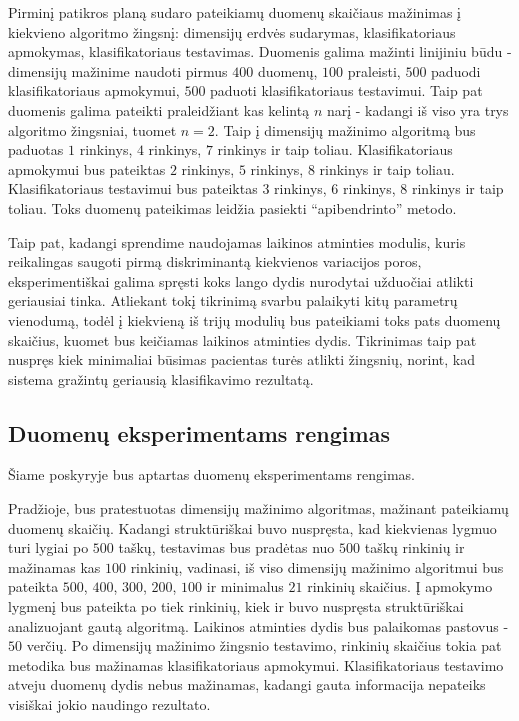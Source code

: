 \documentclass[]{vgtuef}
\begin{document}
Pirminį patikros planą sudaro pateikiamų duomenų skaičiaus mažinimas į kiekvieno algoritmo žingsnį: dimensijų erdvės sudarymas, klasifikatoriaus apmokymas, klasifikatoriaus testavimas. Duomenis galima mažinti linijiniu būdu - dimensijų mažinime naudoti pirmus $400$ duomenų, $100$ praleisti, $500$ paduodi klasifikatoriaus apmokymui, $500$ paduoti klasifikatoriaus testavimui. Taip pat duomenis galima pateikti praleidžiant kas kelintą $n$ narį - kadangi iš viso yra trys algoritmo žingsniai, tuomet $n=2$. Taip į dimensijų mažinimo algoritmą bus paduotas $1$ rinkinys, $4$ rinkinys, $7$ rinkinys ir taip toliau. Klasifikatoriaus apmokymui bus pateiktas $2$ rinkinys, $5$ rinkinys, $8$ rinkinys ir taip toliau. Klasifikatoriaus testavimui bus pateiktas $3$ rinkinys, $6$ rinkinys, $8$ rinkinys ir taip toliau. Toks duomenų pateikimas leidžia pasiekti ``apibendrinto'' metodo. 

Taip pat, kadangi sprendime naudojamas laikinos atminties modulis, kuris reikalingas saugoti pirmą diskriminantą kiekvienos variacijos poros, eksperimentiškai galima spręsti koks lango dydis nurodytai užduočiai atlikti geriausiai tinka. Atliekant tokį tikrinimą svarbu palaikyti kitų parametrų vienodumą, todėl į kiekvieną iš trijų modulių bus pateikiami toks pats duomenų skaičius, kuomet bus keičiamas laikinos atminties dydis. Tikrinimas taip pat nuspręs kiek minimaliai būsimas pacientas turės atlikti žingsnių, norint, kad sistema gražintų geriausią klasifikavimo rezultatą.

\subsection{Duomenų eksperimentams rengimas}

Šiame poskyryje bus aptartas duomenų eksperimentams rengimas. 

Pradžioje, bus pratestuotas dimensijų mažinimo algoritmas, mažinant pateikiamų duomenų skaičių. Kadangi struktūriškai buvo nuspręsta, kad kiekvienas lygmuo turi lygiai po $500$ taškų, testavimas bus pradėtas nuo $500$ taškų rinkinių ir mažinamas kas $100$ rinkinių, vadinasi, iš viso dimensijų mažinimo algoritmui bus pateikta $500$, $400$, $300$, $200$, $100$ ir minimalus $21$ rinkinių skaičius. Į apmokymo lygmenį bus pateikta po tiek rinkinių, kiek ir buvo nuspręsta struktūriškai analizuojant gautą algoritmą. Laikinos atminties dydis bus palaikomas pastovus - $50$ verčių. Po dimensijų mažinimo žingsnio testavimo, rinkinių skaičius tokia pat metodika bus mažinamas klasifikatoriaus apmokymui. Klasifikatoriaus testavimo atveju duomenų dydis nebus mažinamas, kadangi gauta informacija nepateiks visiškai jokio naudingo rezultato.
\end{document}

